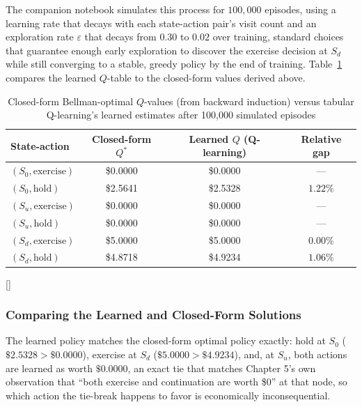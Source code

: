 \documentclass[../ai_in_finance]{subfiles}
\begin{document}
The companion notebook simulates this process for $100{,}000$ episodes, using a learning rate that decays with each state-action pair's visit count and an exploration rate $\varepsilon$ that decays from $0.30$ to $0.02$ over training, standard choices that guarantee enough early exploration to discover the exercise decision at $S_d$ while still converging to a stable, greedy policy by the end of training. Table~\ref{tab:rl_qlearning} compares the learned $Q$-table to the closed-form values derived above.

\begin{table}[htbp]
\centering
\begin{lrbox}{\bookmeasuredbox}
\begin{tabular}{lccc}
\toprule
State-action & Closed-form $Q^*$ & Learned $Q$ (Q-learning) & Relative gap \\
\midrule
$(S_0, \text{exercise})$ & \$0.0000 & \$0.0000 & --- \\
$(S_0, \text{hold})$ & \$2.5641 & \$2.5328 & $1.22\%$ \\
$(S_u, \text{exercise})$ & \$0.0000 & \$0.0000 & --- \\
$(S_u, \text{hold})$ & \$0.0000 & \$0.0000 & --- \\
$(S_d, \text{exercise})$ & \$5.0000 & \$5.0000 & $0.00\%$ \\
$(S_d, \text{hold})$ & \$4.8718 & \$4.9234 & $1.06\%$ \\
\bottomrule
\end{tabular}
\end{lrbox}
\ifdim\wd\bookmeasuredbox<0.65\linewidth
\setlength{\bookcapwidth}{0.65\linewidth}
\else
\setlength{\bookcapwidth}{\wd\bookmeasuredbox}
\fi
{}[\bookcapwidth]{
\usebox{\bookmeasuredbox}
}{
\caption{Closed-form Bellman-optimal $Q$-values (from backward induction) versus tabular Q-learning's learned estimates after 100,000 simulated episodes}
\label{tab:rl_qlearning}
}
\end{table}

\subsubsection*{Comparing the Learned and Closed-Form Solutions}

The learned policy matches the closed-form optimal policy exactly: hold at $S_0$ ($\$2.5328 > \$0.0000$), exercise at
$S_d$ ($\$5.0000 > \$4.9234$), and, at $S_u$, both actions are learned as worth $\$0.0000$, an exact tie that matches Chapter 5's own
observation that ``both exercise and continuation are worth \$0'' at that node, so which action the tie-break happens to favor is
economically inconsequential.
\end{document}
